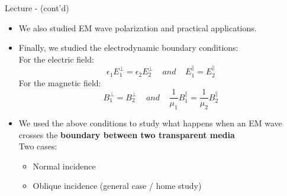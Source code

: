 \begin{frame}{Lecture \summarizedlecture - \lecturesummarytitle (cont'd)}

\begin{itemize}

\item We also studied EM wave polarization and practical applications.

\item Finally, we studied the electrodynamic boundary conditions:\\
          \vspace{0.2cm}
         For the electric field:
         \begin{equation*}
               \epsilon_1 E_1^{\perp} = \epsilon_2 E_2^{\perp}  \;\;\;\; and \;\;\;\;
                E_1^{\parallel} = E_2^{\parallel}
         \end{equation*}
         For the magnetic field:
         \begin{equation*}
               B_1^{\perp} = B_2^{\perp} \;\;\;\; and \;\;\;\;
               \frac{1}{\mu_1} B_1^{\parallel} = \frac{1}{\mu_2} B_2^{\parallel}
         \end{equation*}

\item We used the above conditions to study what happens when
          an EM wave crosses the {\bf boundary between two transparent media}\\
          \vspace{0.2cm}
          Two cases:
          \begin{itemize}
               \item Normal incidence
               \item Oblique incidence (general case / home study)
          \end{itemize}
\end{itemize}

\end{frame}


%
%
%

